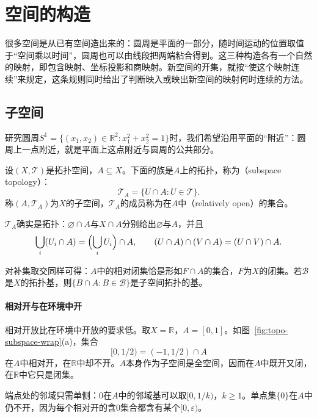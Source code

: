 \section{空间的构造}
\label{sec:topo-constructions}

很多空间是从已有空间造出来的：圆周是平面的一部分，随时间运动的位置取值于“空间乘以时间”，圆周也可以由线段把两端粘合得到。这三种构造各有一个自然的映射，即包含映射、坐标投影和商映射。新空间的开集，就按“使这个映射连续”来规定，这条规则同时给出了判断映入或映出新空间的映射何时连续的方法。

\subsection{子空间}
\label{sec:topo-subspaces}

研究圆周$S^1=\{(x_1,x_2)\in\mathbb R^2:x_1^2+x_2^2=1\}$时，我们希望沿用平面的“附近”：圆周上一点附近，就是平面上这点附近与圆周的公共部分。

\begin{definition}[子空间拓扑]
\label{def:topo-subspace}
设$(X,\mathcal T)$是拓扑空间，$A\subseteq X$。下面的族是$A$上的拓扑，称为（subspace topology）：
\begin{equation}
 \mathcal T_A=\{U\cap A:U\in\mathcal T\}.
 \label{eq:topo-subspace}
\end{equation}
称$(A,\mathcal T_A)$为$X$的子空间，$\mathcal T_A$的成员称为在$A$中（relatively open）的集合。
\end{definition}

$\mathcal T_A$确实是拓扑：$\varnothing\cap A$与$X\cap A$分别给出$\varnothing$与$A$，并且
\[
 \bigcup_i(U_i\cap A)=\Bigl(\bigcup_iU_i\Bigr)\cap A,\qquad
 (U\cap A)\cap(V\cap A)=(U\cap V)\cap A.
\]

对补集取交同样可得：$A$中的相对闭集恰是形如$F\cap A$的集合，$F$为$X$的闭集。若$\mathcal B$是$X$的拓扑基，则$\{B\cap A:B\in\mathcal B\}$是子空间拓扑的基。

\paragraph{相对开与在环境中开}
相对开放比在环境中开放的要求低。取$X=\mathbb R$，$A=[0,1]$。如图~\ref{fig:topo-subspace-wrap}(a)，集合
\[
 [0,1/2)=(-1,1/2)\cap A
\]
在$A$中相对开，在$\mathbb R$中却不开。$A$本身作为子空间是全空间，因而在$A$中既开又闭，在$\mathbb R$中它只是闭集。

端点处的邻域只需单侧：$0$在$A$中的邻域基可以取$[0,1/k)$，$k\geq1$。单点集$\{0\}$在$A$中仍不开，因为每个相对开的含$0$集合都含有某个$[0,\varepsilon)$。


